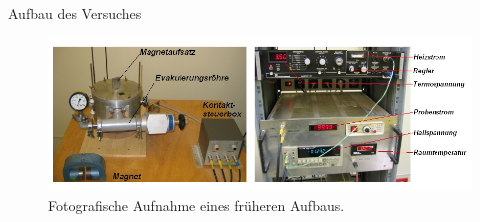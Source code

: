 \documentclass[pdftex, a4paper,11pt, twoside, ngerman]{report}
\begin{document}
\begin{chapter}{Aufbau des Versuches}
    \begin{figure}[b]
      \centering
      \includegraphics[width=\textwidth]{Figures/Aufbau2.png}
      \caption{Fotografische Aufnahme eines früheren Aufbaus.
          \cite{bib:AndereAnleitung}}
      \label{fig:Aufbau2}
    \end{figure}
    
  \end{chapter}
  
  
  
\end{document}
